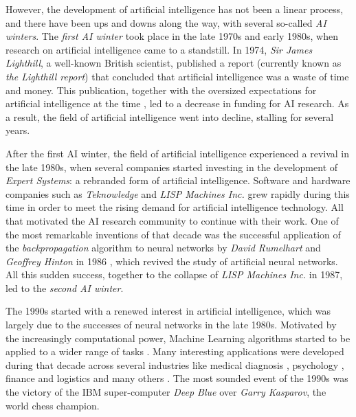 However, the development of artificial intelligence has not been a linear process, and there have been ups and downs along the way, with several so-called \textit{AI winters}. The \textit{first AI winter} took place in the late 1970s and early 1980s, when research on artificial intelligence came to a standstill. In 1974, \textit{Sir James Lighthill}, a well-known British scientist, published a report \cite{lighthillReport} (currently known as \textit{the Lighthill report}) that concluded that artificial intelligence was a waste of time and money. This publication, together with the oversized expectations for artificial intelligence at the time \cite{russellNorvig}, led to a decrease in funding for AI research. As a result, the field of artificial intelligence went into decline, stalling for several years.

After the first AI winter, the field of artificial intelligence experienced a revival in the late 1980s, when several companies started investing in the development of \textit{Expert Systems}: a rebranded form of artificial intelligence. Software and hardware companies such as \textit{Teknowledge} and \textit{LISP Machines Inc.} grew rapidly during this time in order to meet the rising demand for artificial intelligence technology. All that motivated the AI research community to continue with their work. One of the most remarkable inventions of that decade was the successful application of the \textit{backpropagation} algorithm to neural networks by \textit{David Rumelhart} and \textit{Geoffrey Hinton} in 1986 \cite{hinton1986}, which revived the study of artificial neural networks. All this sudden success, together to the collapse of \textit{LISP Machines Inc.} in 1987, led to the \textit{second AI winter}.

The 1990s started with a renewed interest in artificial intelligence, which was largely due to the successes of neural networks in the late 1980s. Motivated by the increasingly computational power, Machine Learning algorithms started to be applied to a wider range of tasks \cite{Tesauro:1995}. Many interesting applications were developed during that decade across several industries like medical diagnosis \cite{declaris1991, Klein1991, punch1992, Cinar1999}, psychology \cite{Dorrer1995, denby1999, Ogawa1999, Perlovsky1999}, finance and logistics \cite{Lipshutz1991, Benaroch1991, Johnson1991, Falas1994} and many others \cite{Smithers1993, Yoo1994, Mashaly1994, Koyma1998}. The most sounded event of the 1990s was the victory of the IBM super-computer \textit{Deep Blue} \cite{Campbell2002} over \textit{Garry Kasparov}, the world chess champion.

